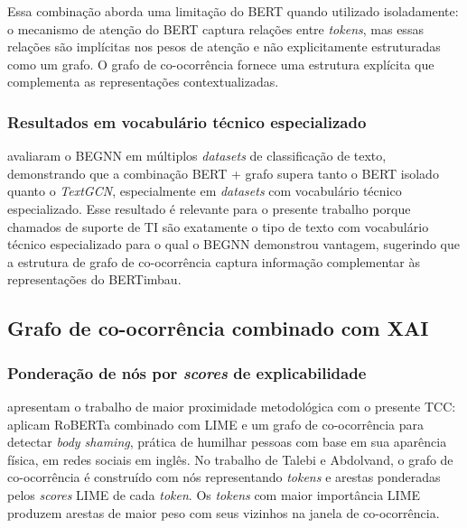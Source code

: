 \documentclass[
    12pt,                %
    openright,           %
    oneside,             %
    a4paper,             %
    english,             %
    brazil               %
]{abntex2}
\begin{document}
Essa combinação aborda uma limitação do BERT quando utilizado isoladamente: o mecanismo de atenção do BERT captura relações entre \textit{tokens}, mas essas relações são implícitas nos pesos de atenção e não explicitamente estruturadas como um grafo. O grafo de co-ocorrência fornece uma estrutura explícita que complementa as representações contextualizadas.

\subsubsection{Resultados em vocabulário técnico especializado}
\label{subsubsec:bert_grafo_resultados}

 avaliaram o BEGNN em múltiplos \textit{datasets} de classificação de texto, demonstrando que a combinação BERT + grafo supera tanto o BERT isolado quanto o \textit{TextGCN}, especialmente em \textit{datasets} com vocabulário técnico especializado. Esse resultado é relevante para o presente trabalho porque chamados de suporte de TI são exatamente o tipo de texto com vocabulário técnico especializado para o qual o BEGNN demonstrou vantagem, sugerindo que a estrutura de grafo de co-ocorrência captura informação complementar às representações do BERTimbau.

\subsection{Grafo de co-ocorrência combinado com XAI}
\label{subsec:grafo_xai}

\subsubsection{Ponderação de nós por \textit{scores} de explicabilidade}
\label{subsubsec:grafo_xai_ponderacao}

 apresentam o trabalho de maior proximidade 
metodológica com o presente TCC: aplicam RoBERTa combinado com LIME 
e um grafo de co-ocorrência para detectar \textit{body shaming}, 
prática de humilhar pessoas com base em sua aparência física, em 
redes sociais em inglês. No trabalho de Talebi e Abdolvand, o grafo 
de co-ocorrência é construído com nós representando \textit{tokens} 
e arestas ponderadas pelos \textit{scores} LIME de cada \textit{token}. 
Os \textit{tokens} com maior importância LIME produzem arestas de 
maior peso com seus vizinhos na janela de co-ocorrência.
\end{document}
